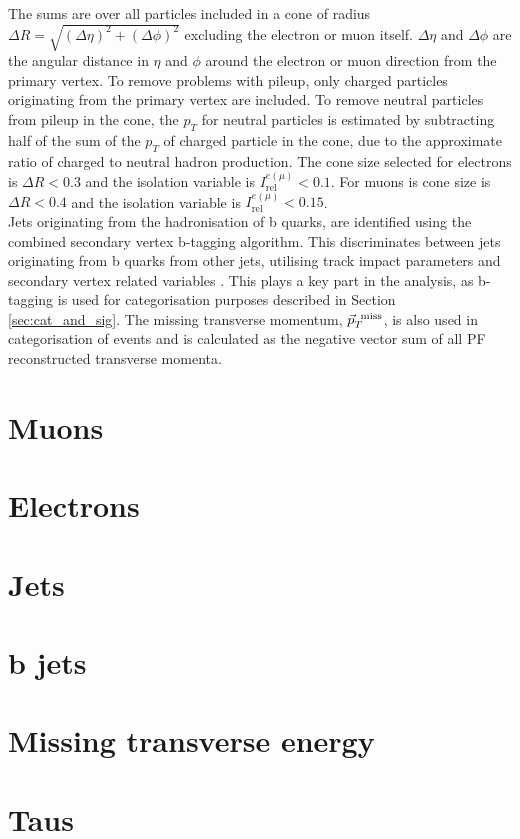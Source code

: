 The sums are over all particles included in a cone of radius \(\Delta R = \sqrt{(\Delta \eta)^2 + (\Delta \phi)^2}\) excluding the electron or muon itself. \(\Delta \eta\) and \(\Delta \phi\) are the angular distance in \(\eta\) and \(\phi\) around the electron or muon direction from the primary vertex. To remove problems with pileup, only charged particles originating from the primary vertex are included. To remove neutral particles from pileup in the cone, the \(p_T\) for neutral particles is estimated by subtracting half of the sum of the \(p_T\) of charged particle in the cone, due to the approximate ratio of charged to neutral hadron production. The cone size selected for electrons is \(\Delta R<0.3\) and the isolation variable is \(I_{\text{rel}}^{e(\mu)} < 0.1\). For muons is cone size is \(\Delta R<0.4\) and the isolation variable is \(I_{\text{rel}}^{e(\mu)} < 0.15\). \\

Jets originating from the hadronisation of b quarks, are identified using the combined secondary vertex b-tagging algorithm. This discriminates between jets originating from b quarks from other jets, utilising track impact parameters and secondary vertex related variables \cite{CMS_btag}. This plays a key part in the analysis, as b-tagging is used for categorisation purposes described in Section \ref{sec:cat_and_sig}. The missing transverse momentum, \(\vec{p}_T^{\hspace{1ex}\text{miss}}\), is also used in categorisation of events and is calculated as the negative vector sum of all PF reconstructed transverse momenta.

\section{Muons}
\section{Electrons}
\section{Jets}
\section{b jets}
\section{Missing transverse energy}
\section{Taus}

